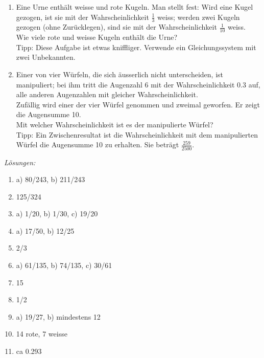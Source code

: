 \begin{ueb}
\begin{enumerate}
    \item Eine Urne enthält weisse und rote Kugeln. Man stellt fest: Wird eine Kugel gezogen, ist sie mit der Wahrscheinlichkeit \( \frac{1}{3} \) weiss; werden zwei Kugeln gezogen (ohne Zurücklegen), sind sie mit der Wahrscheinlichkeit \( \frac{1}{10} \) weiss.\\
          Wie viele rote und weisse Kugeln enthält die Urne?\\
          Tipp: Diese Aufgabe ist etwas kniffliger. Verwende ein Gleichungssystem mit zwei Unbekannten.

    \item Einer von vier Würfeln, die sich äusserlich nicht unterscheiden, ist manipuliert; bei ihm tritt die Augenzahl 6 mit der Wahrscheinlichkeit 0.3 auf, alle anderen Augenzahlen mit gleicher Wahrscheinlichkeit.\\
          Zufällig wird einer der vier Würfel genommen und zweimal geworfen. Er zeigt die Augensumme 10.\\
          Mit welcher Wahrscheinlichkeit ist es der manipulierte Würfel?\\
          Tipp: Ein Zwischenresultat ist die Wahrscheinlichkeit mit dem manipulierten Würfel die Augensumme 10 zu erhalten. Sie beträgt \(\frac{259}{2500}\).
  \end{enumerate}

\end{ueb}
\clearpage
\emph{Lösungen:}
\begin{enumerate}
  \item a) 80/243, b) 211/243
  \item 125/324
  \item a) 1/20, b) 1/30, c) 19/20
  \item a) 17/50, b) 12/25
  \item 2/3
  \item a) 61/135, b) 74/135, c) 30/61
  \item 15
  \item 1/2
  \item a) 19/27, b) mindestens 12
  \item  14 rote, 7 weisse
  \item ca 0.293
\end{enumerate}